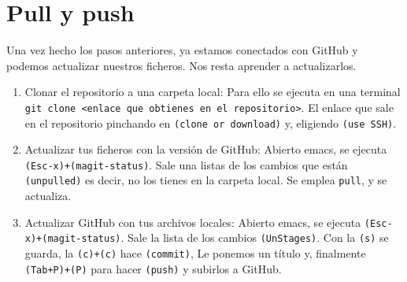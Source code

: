 \section{Pull y push}

Una vez hecho los pasos anteriores, ya estamos conectados con GitHub y podemos
actualizar nuestros ficheros. Nos resta aprender a actualizarlos.

\begin{enumerate}
\item Clonar el repositorio a una carpeta local:
  Para ello se ejecuta en una terminal
  \texttt{git clone <enlace que obtienes en el repositorio>}. El enlace que sale en el
  repositorio pinchando en \texttt{(clone or download)} y, eligiendo \texttt{(use SSH)}.

\item Actualizar tus ficheros con la versión de GitHub:
  Abierto emacs, se ejecuta \texttt{(Esc-x)+(magit-status)}. Sale una listas de los cambios que
  están \texttt{(unpulled)} es decir, no los tienes en la carpeta local. Se emplea \texttt{pull},
  y se actualiza.
\item Actualizar GitHub con tus archivos locales:
  Abierto emacs, se ejecuta \texttt{(Esc-x)+(magit-status)}. Sale la lista de los cambios
  \texttt{(UnStages)}. Con la \texttt{(s)} se guarda, la \texttt{(c)+(c)} hace \texttt{(commit)},
  Le ponemos un título y, finalmente \texttt{(Tab+P)+(P)} para hacer \texttt{(push)} y subirlos a GitHub.
\end{enumerate}